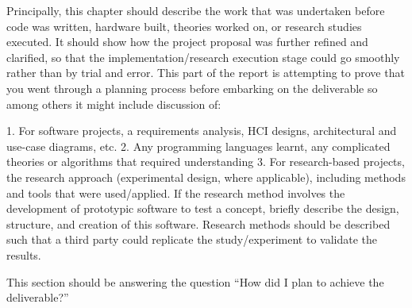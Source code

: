 
Principally, this chapter should describe the work that was undertaken before
code was written, hardware built, theories worked on, or research studies
executed. It should show how the project proposal was further refined and
clarified, so that the implementation/research execution stage could go
smoothly rather than by trial and error. This part of the report is attempting to
prove that you went through a planning process before embarking on the
deliverable so among others it might include discussion of:

1. For software projects, a requirements analysis, HCI designs, architectural
and use-case diagrams, etc.
2. Any programming languages learnt, any complicated theories or algorithms
that required understanding
3. For research-based projects, the research approach (experimental design,
where applicable), including methods and tools that were used/applied. If the
research method involves the development of prototypic software to test a
concept, briefly describe the design, structure, and creation of this software.
Research methods should be described such that a third party could replicate
the study/experiment to validate the results.

This section should be answering the question “How did I plan to achieve the
deliverable?”
